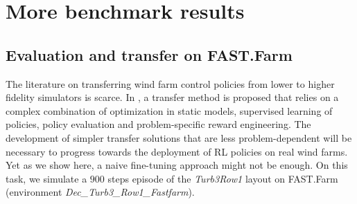 \documentclass{article}
\newcommand{\md}[1]{{\color{red}#1}}
\begin{document}
\section{More benchmark results}\label{appendix:results}
\subsection{Evaluation and transfer on FAST.Farm}\label{appendix:transfer-curves}
The literature on transferring wind farm control policies from lower to higher fidelity simulators is scarce. In \cite{monroc2024towards}, a transfer method is proposed that relies on a complex combination of optimization in static models, supervised learning of policies, policy evaluation and problem-specific reward engineering. The development of simpler transfer solutions that are less problem-dependent will be necessary to progress towards the deployment of RL policies on real wind farms. Yet as we show here, a naive fine-tuning approach might not be enough. 
On this task, we simulate a $900$ steps episode of the \textit{Turb3Row1} layout on FAST.Farm (environment  \textit{Dec\_Turb3\_Row1\_Fastfarm}). 
\end{document}
